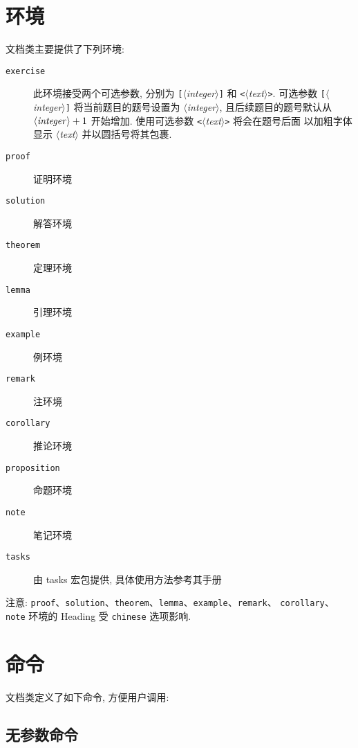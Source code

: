\documentclass{article}
\newcommand{\option}[1]{\texttt{#1}}
\newcommand{\env}[1]{\texttt{#1}}
\newcommand{\pkg}[1]{\textsf{#1}}
\newcommand{\meta}[1]{\mbox{$\langle$\it #1\/$\rangle$}}
\newcommand{\oargBracket}[1]{{\tt[}\meta{#1}{\tt]}}
\newcommand{\oargAngle}[1]{{\tt<}\meta{#1}{\tt>}}
\begin{document}
\section{环境}

文档类主要提供了下列环境:
\begin{description}
  \item [\env{exercise}] 此环境接受两个可选参数, 分别为 \oargBracket{integer}
    和 \oargAngle{text}. 可选参数 \oargBracket{integer} 将当前题目的题号设置为 \meta{integer},
    且后续题目的题号默认从 $\meta{integer}+1$ 开始增加. 使用可选参数 \oargAngle{text} 将会在题号后面
    以加粗字体显示 \meta{text} 并以圆括号将其包裹.
  \item [\env{proof}] 证明环境
  \item [\env{solution}] 解答环境
  \item [\env{theorem}] 定理环境
  \item [\env{lemma}] 引理环境
  \item [\env{example}] 例环境
  \item [\env{remark}] 注环境
  \item [\env{corollary}] 推论环境
  \item [\env{proposition}] 命题环境
  \item [\env{note}] 笔记环境
  \item [\env{tasks}] 由 \pkg{tasks} 宏包提供, 具体使用方法参考其手册
\end{description}

注意: \env{proof}、\env{solution}、\env{theorem}、\env{lemma}、\env{example}、\env{remark}、
\env{corollary}、\env{note} 环境的 Heading 受 \option{chinese} 选项影响.


\section{命令}

文档类定义了如下命令, 方便用户调用:

\subsection{无参数命令}
\end{document}
